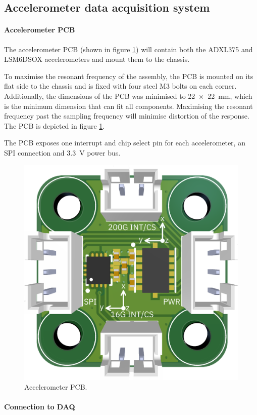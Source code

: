 \documentclass[a4paper,11pt]{article}
\begin{document}
\subsection{Accelerometer data acquisition system}
\paragraph{Accelerometer PCB}

The accelerometer PCB (shown in figure \ref{fig:accelerometers-pcb}) will contain both the ADXL375 and LSM6DSOX accelerometers and mount them to the chassis.

To maximise the resonant frequency of the assembly, the PCB is mounted on its flat side to the chassis and is fixed with four steel M3 bolts on each corner. Additionally, the dimensions of the PCB was minimised to \SI{22x22}{\milli\metre}, which is the minimum dimension that can fit all components. Maximising the resonant frequency past the sampling frequency will minimise distortion of the response. The PCB is depicted in figure \ref{fig:accelerometers-pcb}.

The PCB exposes one interrupt and chip select pin for each accelerometer, an SPI connection and \SI{3.3}{\volt} power bus.

\begin{figure}[H]
  \centering
  \includegraphics[width=0.5\linewidth]{images/Accelerometers_PCB.png}
  \caption{Accelerometer PCB.}
  \label{fig:accelerometers-pcb}
\end{figure}

\paragraph{Connection to DAQ}
\end{document}
